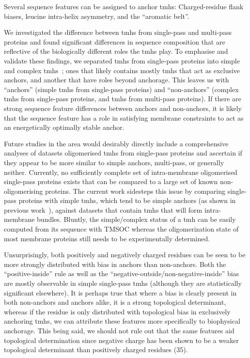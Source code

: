 Several sequence features can be assigned to anchor \gls{tmh}s: Charged-residue flank biases, leucine intra-helix asymmetry, and the “aromatic belt”.

We investigated the difference between \gls{tmh}s from single-pass and multi-pass proteins and found significant differences in sequence composition that are reflective of the biologically different roles the \gls{tmh}s play. To emphasise and validate these findings, we separated \gls{tmh}s from single-pass proteins into simple and complex \gls{tmh}s~\cite{Wong2011, Wong2012}; ones that likely contains mostly \gls{tmh}s that act as exclusive anchors, and another that have roles beyond anchorage. This leaves us with ``anchors'' (simple \gls{tmh}s from single-pass proteins) and “non-anchors” (complex \gls{tmh}s from single-pass proteins, and \gls{tmh}s from multi-pass proteins). If there are strong sequence feature differences between anchors and non-anchors, it is likely that the sequence feature has a role in satisfying membrane constraints to act as an energetically optimally stable anchor.

Future studies in the area would desirably directly include a comprehensive analyses of datasets oligomerised \gls{tmh}s from single-pass proteins and ascertain if they appear to be more similar to simple anchors, multi-pass, or generally neither. Currently, no sufficiently complete set of intra-membrane oligomerised single-pass proteins exists that can be compared to a large set of known non-oligomerising proteins. The current work sidesteps this issue by comparing single-pass proteins with simple \gls{tmh}s, which tend to be simple anchors (as shown in previous work~\cite{Wong2011, Wong2012}), against datasets that contain \gls{tmh}s that will form intra-membrane bundles. Bluntly, the simple/complex status of a \gls{tmh} can be easily computed from its sequence with TMSOC whereas the oligomerization state of most membrane proteins still needs to be experimentally determined.

Unsurprisingly, both positively and negatively charged residues can be seen to be more strongly distributed with bias in anchors than non-anchors. Both the “positive-inside” rule as well as the “negative-outside/non-negative-inside” bias are mostly observable in simple single-pass \gls{tmh}s (although they are statistically significant elsewhere). It is perhaps true that where a bias is clearly present in both non-anchors and anchors alike, it is a strong topological determinant, whereas if the residue is only distributed with topological bias in exclusively anchoring \gls{tmh}s, we can attribute these features more specifically to biophysical anchorage. This being said, we should not rule out that the same features aid topological determination since negative charge has been shown to be a weaker topological determinant than positively charged residues (35).

